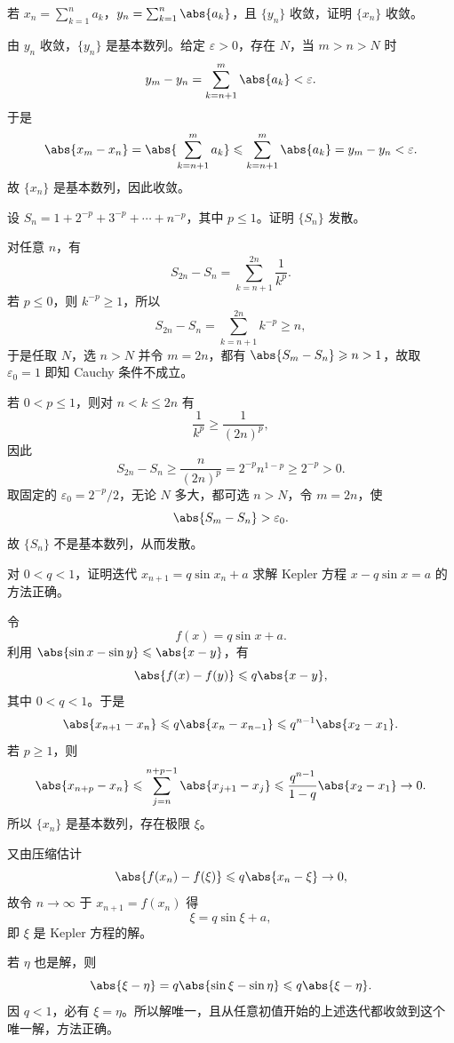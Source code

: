 \begin{xexercise}[3.4.5 练习题 5]
若 $x_n=\sum_{k=1}^{n}a_k$，$y_n=\sum_{k=1}^{n}\abs{a_k}$，且 $\{y_n\}$ 收敛，证明 $\{x_n\}$ 收敛。
\end{xexercise}
\begin{xsolution}
由 $y_n$ 收敛，$\{y_n\}$ 是基本数列。给定 $\varepsilon>0$，存在 $N$，当 $m>n>N$ 时
\[
  y_m-y_n=\sum_{k=n+1}^{m}\abs{a_k}<\varepsilon.
\]
于是
\[
  \abs{x_m-x_n}
  =\abs{\sum_{k=n+1}^{m}a_k}
  \leqslant\sum_{k=n+1}^{m}\abs{a_k}
  =y_m-y_n<\varepsilon.
\]
故 $\{x_n\}$ 是基本数列，因此收敛。
\end{xsolution}

\begin{xexercise}[3.4.5 练习题 6]
设 $S_n=1+2^{-p}+3^{-p}+\cdots+n^{-p}$，其中 $p\leqslant1$。证明 $\{S_n\}$ 发散。
\end{xexercise}
\begin{xsolution}
对任意 $n$，有
\[
  S_{2n}-S_n=\sum_{k=n+1}^{2n}\frac1{k^p}.
\]
若 $p\leqslant0$，则 $k^{-p}\geqslant1$，所以
\[
  S_{2n}-S_n=\sum_{k=n+1}^{2n}k^{-p}\geqslant n,
\]
于是任取 $N$，选 $n>N$ 并令 $m=2n$，都有 $\abs{S_m-S_n}\geqslant n>1$，故取 $\varepsilon_0=1$ 即知 Cauchy 条件不成立。

若 $0<p\leqslant1$，则对 $n<k\leqslant2n$ 有
\[
  \frac1{k^p}\geqslant\frac1{(2n)^p},
\]
因此
\[
  S_{2n}-S_n
  \geqslant\frac{n}{(2n)^p}
  =2^{-p}n^{1-p}\geqslant2^{-p}>0.
\]
取固定的 $\varepsilon_0=2^{-p}/2$，无论 $N$ 多大，都可选 $n>N$，令 $m=2n$，使
\[
  \abs{S_m-S_n}>\varepsilon_0.
\]
故 $\{S_n\}$ 不是基本数列，从而发散。
\end{xsolution}

\begin{xexercise}[3.4.5 练习题 7]
对 $0<q<1$，证明迭代 $x_{n+1}=q\sin x_n+a$ 求解 Kepler 方程 $x-q\sin x=a$ 的方法正确。
\end{xexercise}
\begin{xsolution}
令
\[
  f(x)=q\sin x+a.
\]
利用 $\abs{\sin x-\sin y}\leqslant\abs{x-y}$，有
\[
  \abs{f(x)-f(y)}\leqslant q\abs{x-y},
\]
其中 $0<q<1$。于是
\[
  \abs{x_{n+1}-x_n}
  \leqslant q\abs{x_n-x_{n-1}}
  \leqslant q^{n-1}\abs{x_2-x_1}.
\]
若 $p\geqslant1$，则
\[
  \abs{x_{n+p}-x_n}
  \leqslant\sum_{j=n}^{n+p-1}\abs{x_{j+1}-x_j}
  \leqslant\frac{q^{n-1}}{1-q}\abs{x_2-x_1}\to0.
\]
所以 $\{x_n\}$ 是基本数列，存在极限 $\xi$。

又由压缩估计
\[
  \abs{f(x_n)-f(\xi)}\leqslant q\abs{x_n-\xi}\to0,
\]
故令 $n\to\infty$ 于 $x_{n+1}=f(x_n)$ 得
\[
  \xi=q\sin\xi+a,
\]
即 $\xi$ 是 Kepler 方程的解。

若 $\eta$ 也是解，则
\[
  \abs{\xi-\eta}
  =q\abs{\sin\xi-\sin\eta}
  \leqslant q\abs{\xi-\eta}.
\]
因 $q<1$，必有 $\xi=\eta$。所以解唯一，且从任意初值开始的上述迭代都收敛到这个唯一解，方法正确。
\end{xsolution}

